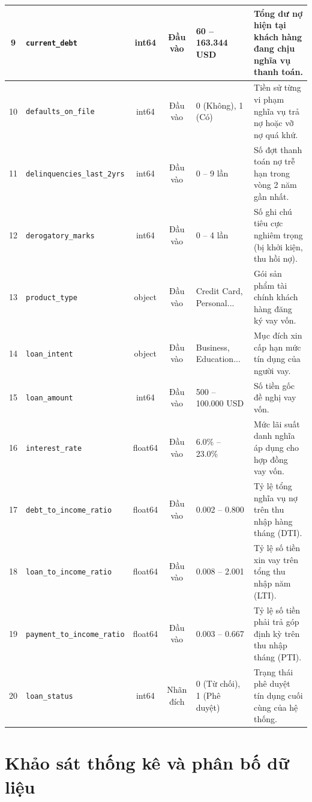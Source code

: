 \documentclass[12pt,a4paper,oneside]{report}
\begin{document}
\begin{table}[htbp]
\begin{tabular}{|c|l|c|c|l|p{5.5cm}|}
    \hline
    9 & \texttt{current\_debt} & int64 & Đầu vào & 60 -- 163.344 USD & Tổng dư nợ hiện tại khách hàng đang chịu nghĩa vụ thanh toán. \\
    \hline
    10 & \texttt{defaults\_on\_file} & int64 & Đầu vào & 0 (Không), 1 (Có) & Tiền sử từng vi phạm nghĩa vụ trả nợ hoặc vỡ nợ quá khứ. \\
    \hline
    11 & \texttt{delinquencies\_last\_2yrs} & int64 & Đầu vào & 0 -- 9 lần & Số đợt thanh toán nợ trễ hạn trong vòng 2 năm gần nhất. \\
    \hline
    12 & \texttt{derogatory\_marks} & int64 & Đầu vào & 0 -- 4 lần & Số ghi chú tiêu cực nghiêm trọng (bị khởi kiện, thu hồi nợ). \\
    \hline
    13 & \texttt{product\_type} & object & Đầu vào & Credit Card, Personal... & Gói sản phẩm tài chính khách hàng đăng ký vay vốn. \\
    \hline
    14 & \texttt{loan\_intent} & object & Đầu vào & Business, Education... & Mục đích xin cấp hạn mức tín dụng của người vay. \\
    \hline
    15 & \texttt{loan\_amount} & int64 & Đầu vào & 500 -- 100.000 USD & Số tiền gốc đề nghị vay vốn. \\
    \hline
    16 & \texttt{interest\_rate} & float64 & Đầu vào & 6.0\% -- 23.0\% & Mức lãi suất danh nghĩa áp dụng cho hợp đồng vay vốn. \\
    \hline
    17 & \texttt{debt\_to\_income\_ratio} & float64 & Đầu vào & 0.002 -- 0.800 & Tỷ lệ tổng nghĩa vụ nợ trên thu nhập hàng tháng (DTI). \\
    \hline
    18 & \texttt{loan\_to\_income\_ratio} & float64 & Đầu vào & 0.008 -- 2.001 & Tỷ lệ số tiền xin vay trên tổng thu nhập năm (LTI). \\
    \hline
    19 & \texttt{payment\_to\_income\_ratio} & float64 & Đầu vào & 0.003 -- 0.667 & Tỷ lệ số tiền phải trả góp định kỳ trên thu nhập tháng (PTI). \\
    \hline
    20 & \texttt{loan\_status} & int64 & Nhãn đích & 0 (Từ chối), 1 (Phê duyệt) & Trạng thái phê duyệt tín dụng cuối cùng của hệ thống. \\
    \hline
\end{tabular}
\end{table}

\section{Khảo sát thống kê và phân bố dữ liệu}
\end{document}
